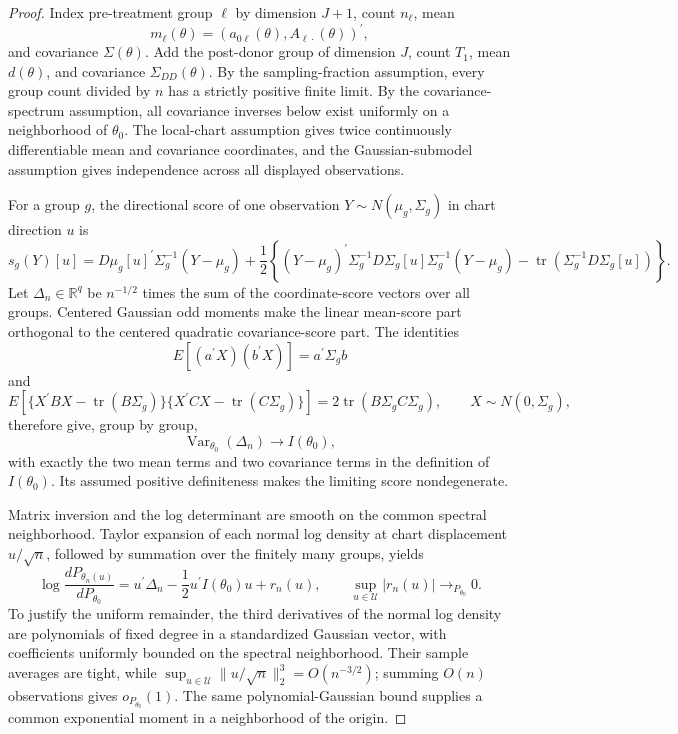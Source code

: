 \documentclass{article}
\begin{document}
\begin{proof}
Index pre-treatment group \(\ell\) by dimension \(J+1\), count \(n_\ell\), mean
\[
m_\ell(\theta)=(a_{0\ell}(\theta),A_{\ell\cdot}(\theta))^{\prime},
\]
and covariance \(\Sigma(\theta)\).  Add the post-donor group of dimension \(J\), count \(T_1\), mean \(d(\theta)\), and covariance \(\Sigma_{DD}(\theta)\).  By the sampling-fraction assumption, every group count divided by \(n\) has a strictly positive finite limit.  By the covariance-spectrum assumption, all covariance inverses below exist uniformly on a neighborhood of \(\theta_0\).  The local-chart assumption gives twice continuously differentiable mean and covariance coordinates, and the Gaussian-submodel assumption gives independence across all displayed observations.

For a group \(g\), the directional score of one observation \(Y\sim N(\mu_g,\Sigma_g)\) in chart direction \(u\) is
\[
s_g(Y)[u]
=D\mu_g[u]^{\prime}\Sigma_g^{-1}(Y-\mu_g)
+\frac12\left\{
(Y-\mu_g)^{\prime}\Sigma_g^{-1}D\Sigma_g[u]
\Sigma_g^{-1}(Y-\mu_g)
-\operatorname{tr}(\Sigma_g^{-1}D\Sigma_g[u])
\right\}.
\]
Let \(\Delta_n\in\mathbb R^q\) be \(n^{-1/2}\) times the sum of the coordinate-score vectors over all groups.  Centered Gaussian odd moments make the linear mean-score part orthogonal to the centered quadratic covariance-score part.  The identities
\[
E[(a^{\prime}X)(b^{\prime}X)]=a^{\prime}\Sigma_gb
\]
and
\[
E\!\left[
\{X^{\prime}BX-\operatorname{tr}(B\Sigma_g)\}
\{X^{\prime}CX-\operatorname{tr}(C\Sigma_g)\}
\right]
=2\operatorname{tr}(B\Sigma_gC\Sigma_g),
\qquad X\sim N(0,\Sigma_g),
\]
therefore give, group by group,
\[
\operatorname{Var}_{\theta_0}(\Delta_n)\longrightarrow I(\theta_0),
\]
with exactly the two mean terms and two covariance terms in the definition of \(I(\theta_0)\).  Its assumed positive definiteness makes the limiting score nondegenerate.

Matrix inversion and the log determinant are smooth on the common spectral neighborhood.  Taylor expansion of each normal log density at chart displacement \(u/\sqrt n\), followed by summation over the finitely many groups, yields
\[
\log\frac{dP_{\theta_n(u)}}{dP_{\theta_0}}
=u^{\prime}\Delta_n-\frac12u^{\prime}I(\theta_0)u+r_n(u),
\qquad
\sup_{u\in\mathcal U}|r_n(u)|
\longrightarrow_{P_{\theta_0}}0.
\]
To justify the uniform remainder, the third derivatives of the normal log density are polynomials of fixed degree in a standardized Gaussian vector, with coefficients uniformly bounded on the spectral neighborhood.  Their sample averages are tight, while
\(\sup_{u\in\mathcal U}\lVert u/\sqrt n\rVert_2^3=O(n^{-3/2})\); summing \(O(n)\) observations gives \(o_{P_{\theta_0}}(1)\).  The same polynomial-Gaussian bound supplies a common exponential moment in a neighborhood of the origin.


\end{proof}
\end{document}
